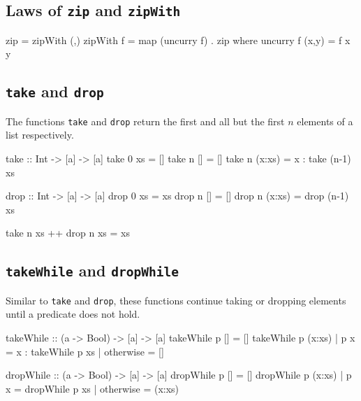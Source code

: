 \documentclass[10pt]{article}
\begin{document}
\subsection{Laws of \texttt{zip} and \texttt{zipWith}}
\begin{code}
zip = zipWith (,)
zipWith f = map (uncurry f) . zip
              where uncurry f (x,y) = f x y
\end{code}
\subsection{\texttt{take} and \texttt{drop}}
The functions \texttt{take} and \texttt{drop} return the first and all but the first $n$ elements of a list respectively.
\begin{code}
take :: Int -> [a] -> [a]
take 0 xs = []
take n [] = []
take n (x:xs) = x : take (n-1) xs

drop :: Int -> [a] -> [a]
drop 0 xs = xs
drop n [] = []
drop n (x:xs) = drop (n-1) xs

take n xs ++ drop n xs = xs
\end{code}
\subsection{\texttt{takeWhile} and \texttt{dropWhile}}
Similar to \texttt{take} and \texttt{drop}, these functions continue taking or dropping elements until a predicate does not hold.
\begin{code}
takeWhile :: (a -> Bool) -> [a] -> [a]
takeWhile p [] = []
takeWhile p (x:xs) 
  | p x = x : takeWhile p xs
  | otherwise = []

dropWhile :: (a -> Bool) -> [a] -> [a]
dropWhile p [] = []
dropWhile p (x:xs)
  | p x = dropWhile p xs
  | otherwise = (x:xs)
\end{code}
\end{document}
